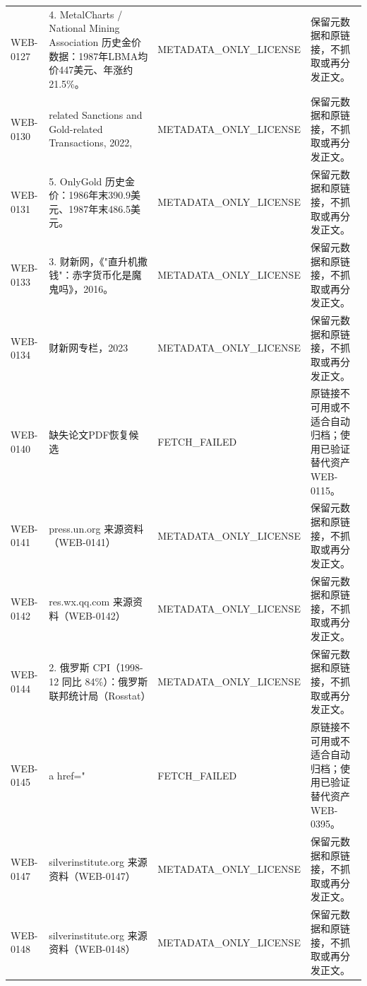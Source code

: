\documentclass[UTF8,openany,oneside,11pt]{ctexbook}
\begin{document}
\begin{longtable}{L{1.5cm}L{5.5cm}L{3cm}L{5cm}}
WEB-\allowbreak{}0127 & 4. MetalCharts /\allowbreak{} National Mining Association 历史金价数据：1987年LBMA均价447美元、年涨约21.5\%。 & METADATA\_\allowbreak{}ONLY\_\allowbreak{}LICENSE & 保留元数据和原链接，不抓取或再分发正文。 \\
WEB-\allowbreak{}0130 & related Sanctions and Gold-\allowbreak{}related Transactions,\allowbreak{} 2022,\allowbreak{} & METADATA\_\allowbreak{}ONLY\_\allowbreak{}LICENSE & 保留元数据和原链接，不抓取或再分发正文。 \\
WEB-\allowbreak{}0131 & 5. OnlyGold 历史金价：1986年末390.9美元、1987年末486.5美元。 & METADATA\_\allowbreak{}ONLY\_\allowbreak{}LICENSE & 保留元数据和原链接，不抓取或再分发正文。 \\
WEB-\allowbreak{}0133 & 3. 财新网，《"直升机撒钱"：赤字货币化是魔鬼吗》，2016。 & METADATA\_\allowbreak{}ONLY\_\allowbreak{}LICENSE & 保留元数据和原链接，不抓取或再分发正文。 \\
WEB-\allowbreak{}0134 & 财新网专栏，2023 & METADATA\_\allowbreak{}ONLY\_\allowbreak{}LICENSE & 保留元数据和原链接，不抓取或再分发正文。 \\
WEB-\allowbreak{}0140 & 缺失论文PDF恢复候选 & FETCH\_\allowbreak{}FAILED & 原链接不可用或不适合自动归档；使用已验证替代资产 WEB-\allowbreak{}0115。 \\
WEB-\allowbreak{}0141 & press.un.org 来源资料（WEB-\allowbreak{}0141） & METADATA\_\allowbreak{}ONLY\_\allowbreak{}LICENSE & 保留元数据和原链接，不抓取或再分发正文。 \\
WEB-\allowbreak{}0142 & res.wx.qq.com 来源资料（WEB-\allowbreak{}0142） & METADATA\_\allowbreak{}ONLY\_\allowbreak{}LICENSE & 保留元数据和原链接，不抓取或再分发正文。 \\
WEB-\allowbreak{}0144 & 2. 俄罗斯 CPI（1998-\allowbreak{}12 同比 84\%）：俄罗斯联邦统计局（Rosstat） & METADATA\_\allowbreak{}ONLY\_\allowbreak{}LICENSE & 保留元数据和原链接，不抓取或再分发正文。 \\
WEB-\allowbreak{}0145 & a href=" & FETCH\_\allowbreak{}FAILED & 原链接不可用或不适合自动归档；使用已验证替代资产 WEB-\allowbreak{}0395。 \\
WEB-\allowbreak{}0147 & silverinstitute.org 来源资料（WEB-\allowbreak{}0147） & METADATA\_\allowbreak{}ONLY\_\allowbreak{}LICENSE & 保留元数据和原链接，不抓取或再分发正文。 \\
WEB-\allowbreak{}0148 & silverinstitute.org 来源资料（WEB-\allowbreak{}0148） & METADATA\_\allowbreak{}ONLY\_\allowbreak{}LICENSE & 保留元数据和原链接，不抓取或再分发正文。 \\

\end{longtable}
\end{document}
